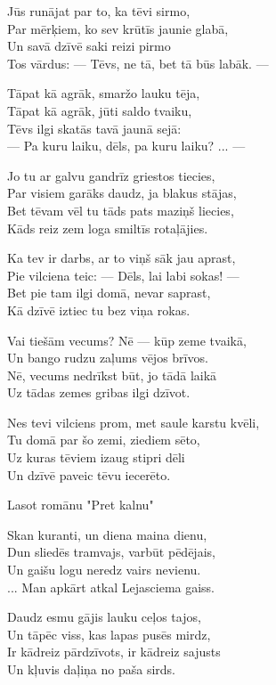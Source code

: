 \documentclass[14pt]{extarticle}
\begin{document}
{{Jūs runājat par to, ka tēvi sirmo,\\
Par mērķiem, ko sev krūtīs jaunie glabā,\\
Un savā dzīvē saki reizi pirmo\\
Tos vārdus: --- Tēvs, ne tā, bet tā būs labāk. ---

Tāpat kā agrāk, smaržo lauku tēja,\\
Tāpat kā agrāk, jūti saldo tvaiku,\\
Tēvs ilgi skatās tavā jaunā sejā:\\
--- Pa kuru laiku, dēls, pa kuru laiku? ... ---

Jo tu ar galvu gandrīz griestos tiecies,\\
Par visiem garāks daudz, ja blakus stājas,\\
Bet tēvam vēl tu tāds pats maziņš liecies,\\
Kāds reiz zem loga smiltīs rotaļājies.

Ka tev ir darbs, ar to viņš sāk jau aprast,\\
Pie vilciena teic: --- Dēls, lai labi sokas! ---\\
Bet pie tam ilgi domā, nevar saprast,\\
Kā dzīvē iztiec tu bez viņa rokas.

Vai tiešām vecums? Nē --- kūp zeme tvaikā,\\
Un bango rudzu zaļums vējos brīvos.\\
Nē, vecums nedrīkst būt, jo tādā laikā\\
Uz tādas zemes gribas ilgi dzīvot.

Nes tevi vilciens prom, met saule karstu kvēli,\\
Tu domā par šo zemi, ziediem sēto,\\
Uz kuras tēviem izaug stipri dēli\\
Un dzīvē paveic tēvu iecerēto.

\newpage

{\large \sc Lasot romānu "Pret kalnu"}

Skan kuranti, un diena maina dienu,\\
Dun sliedēs tramvajs, varbūt pēdējais,\\
Un gaišu logu neredz vairs nevienu.\\
... Man apkārt atkal Lejasciema gaiss.

Daudz esmu gājis lauku ceļos tajos,\\
Un tāpēc viss, kas lapas pusēs mirdz,\\
Ir kādreiz pārdzīvots, ir kādreiz sajusts\\
Un kļuvis daļiņa no paša sirds.

}}
\end{document}
